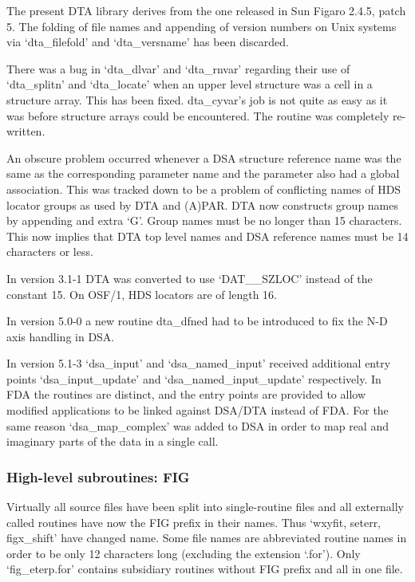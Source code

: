    The present DTA library derives from the one released in Sun Figaro
   2.4.5, patch 5. The folding of file names and appending of version
   numbers on Unix systems via `dta\_filefold' and `dta\_versname' has
   been discarded.

   There was a bug in `dta\_dlvar' and `dta\_rnvar' regarding their use of
   `dta\_splitn' and `dta\_locate' when an upper level structure was a
   cell in a structure array.  This has been fixed. dta\_cyvar's job is
   not quite as easy as it was before structure arrays could be
   encountered.  The routine was completely re-written.

   An obscure problem occurred whenever a DSA structure reference name
   was the same as the corresponding parameter name and the parameter
   also had a global association. This was tracked down to be a problem
   of conflicting names of HDS locator groups as used by DTA and (A)PAR.
   DTA now constructs group names by appending and extra `G'. Group
   names must be no longer than 15 characters. This now implies that DTA
   top level names and DSA reference names must be 14 characters or
   less.

   In version 3.1-1 DTA was converted to use `DAT\_\_SZLOC' instead of the
   constant 15.  On OSF/1, HDS locators are of length 16.

   In version 5.0-0 a new routine dta\_dfned had to be introduced to fix
   the N-D axis handling in DSA.

   In version 5.1-3 `dsa\_input' and `dsa\_named\_input' received
   additional entry points `dsa\_\-input\_\-update' and
   `dsa\_named\_input\_update' respectively. In FDA the routines are
   distinct, and the entry points are provided to allow modified
   applications to be linked against DSA/DTA instead of FDA. For the
   same reason `dsa\_map\_complex' was added to DSA in order to map real
   and imaginary parts of the data in a single call.


\subsubsection{\label{changessub7}High-level subroutines: FIG}

   Virtually all source files have been split into single-routine files
   and all externally called routines have now the FIG prefix in their
   names. Thus `wxyfit, seterr, figx\_shift' have changed name.  Some
   file names are abbreviated routine names in order to be only 12
   characters long (excluding the extension `.for').  Only
   `fig\_eterp.for' contains subsidiary routines without FIG prefix and
   all in one file.

